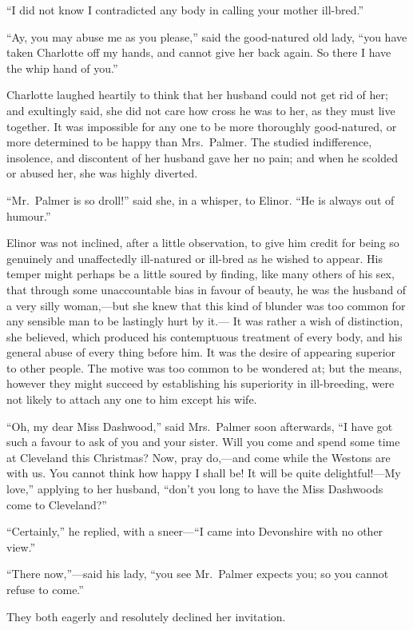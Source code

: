 \documentclass{article}
\begin{document}
``I did not know I contradicted any body in calling
your mother ill-bred.''

``Ay, you may abuse me as you please,'' said the good-natured
old lady, ``you have taken Charlotte off my hands, and cannot
give her back again.  So there I have the whip hand of you.''

Charlotte laughed heartily to think that her
husband could not get rid of her; and exultingly said,
she did not care how cross he was to her, as they must
live together.  It was impossible for any one to be more
thoroughly good-natured, or more determined to be happy
than Mrs.\ Palmer.  The studied indifference, insolence,
and discontent of her husband gave her no pain;
and when he scolded or abused her, she was highly diverted.

``Mr.\ Palmer is so droll!'' said she, in a whisper,
to Elinor.  ``He is always out of humour.''

Elinor was not inclined, after a little observation,
to give him credit for being so genuinely and unaffectedly
ill-natured or ill-bred as he wished to appear.
His temper might perhaps be a little soured by finding,
like many others of his sex, that through some unaccountable
bias in favour of beauty, he was the husband of a very silly
woman,---but she knew that this kind of blunder was too
common for any sensible man to be lastingly hurt by it.---%
It was rather a wish of distinction, she believed,
which produced his contemptuous treatment of every body,
and his general abuse of every thing before him.
It was the desire of appearing superior to other people.
The motive was too common to be wondered at; but the means,
however they might succeed by establishing his superiority
in ill-breeding, were not likely to attach any one to him
except his wife.

``Oh, my dear Miss Dashwood,'' said Mrs.\ Palmer soon afterwards,
``I have got such a favour to ask of you and your sister.
Will you come and spend some time at Cleveland this
Christmas?  Now, pray do,---and come while the Westons are
with us.  You cannot think how happy I shall be!  It will
be quite delightful!---My love,'' applying to her husband,
``don't you long to have the Miss Dashwoods come to Cleveland?''

``Certainly,'' he replied, with a sneer---``I came
into Devonshire with no other view.''

``There now,''---said his lady, ``you see Mr.\ Palmer
expects you; so you cannot refuse to come.''

They both eagerly and resolutely declined her invitation.
\end{document}
